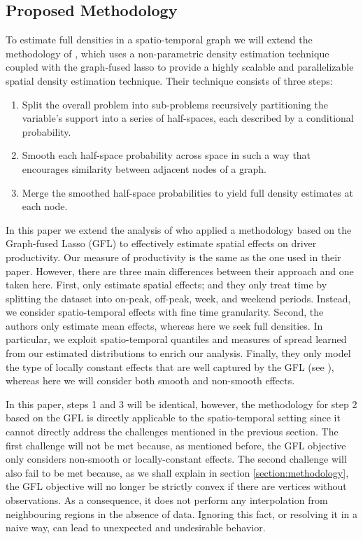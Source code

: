 \documentclass[a4paper, 11pt]{article}
\begin{document}
\subsection{Proposed Methodology}

To estimate full densities in a spatio-temporal graph we will extend the methodology of \citet{tansey-etal-2017}, which uses a non-parametric density estimation technique coupled with the graph-fused lasso to provide a highly scalable and parallelizable spatial density estimation technique. Their technique consists of three steps:
\begin{enumerate}
    \item Split the overall problem into sub-problems recursively partitioning the variable's support into a series of half-spaces, each described by a conditional probability. 
    \item Smooth each half-space probability across space in such a way that encourages similarity between adjacent nodes of a graph.
    \item Merge the smoothed half-space probabilities to yield full density estimates at each node.
\end{enumerate}

In this paper we extend the analysis of \citet{zuniga-etal-2019} who applied a methodology based on the Graph-fused Lasso (GFL) to effectively estimate spatial effects on driver productivity. Our measure of productivity is the same as the one used in their paper. However, there are three main differences between their approach and one taken here. First, \citet{zuniga-etal-2019} only estimate spatial effects; and they only treat time by splitting the dataset into on-peak, off-peak, week, and weekend periods. Instead, we consider spatio-temporal effects with fine time granularity. Second, the authors only estimate mean effects, whereas here we seek full densities. In particular, we exploit spatio-temporal quantiles and measures of spread learned from our estimated distributions to enrich our analysis. Finally, they only model the type of locally constant effects that are well captured by the GFL (see \citet{tibshirani-2015}), whereas here we will consider both smooth and non-smooth effects.

In this paper, steps 1 and 3 will be identical, however, the methodology for step 2 based on the GFL is directly applicable to the spatio-temporal setting since it cannot directly address the challenges mentioned in the previous section. The first challenge will not be met because, as mentioned before, the GFL objective only considers non-smooth or locally-constant effects. The second challenge will also fail to be met because, as we shall explain in section \ref{section:methodology}, the GFL objective will no longer be strictly convex if there are vertices without observations. As a consequence, it does not perform any interpolation from neighbouring regions in the absence of data. Ignoring this fact, or resolving it in a naive way, can lead to unexpected and undesirable behavior. 
\end{document}
